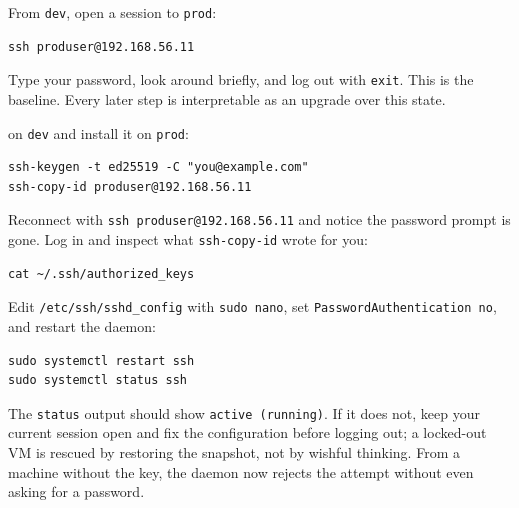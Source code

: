 From \texttt{dev}, open a session to \texttt{prod}:

\begin{verbatim}
ssh produser@192.168.56.11
\end{verbatim}

Type your password, look around briefly, and log out with \texttt{exit}. This is the baseline. Every later step is interpretable as an upgrade over this state.

 on \texttt{dev} and install it on \texttt{prod}:

\begin{verbatim}
ssh-keygen -t ed25519 -C "you@example.com"
ssh-copy-id produser@192.168.56.11
\end{verbatim}

Reconnect with \texttt{ssh produser@192.168.56.11} and notice the password prompt is gone. Log in and inspect what \texttt{ssh-copy-id} wrote for you:

\begin{verbatim}
cat ~/.ssh/authorized_keys
\end{verbatim}




Edit \texttt{/etc/ssh/sshd\_config} with \texttt{sudo nano}, set \texttt{PasswordAuthentication no}, and restart the daemon:

\begin{verbatim}
sudo systemctl restart ssh
sudo systemctl status ssh
\end{verbatim}

The \texttt{status} output should show \texttt{active (running)}. If it does not, keep your current session open and fix the configuration before logging out; a locked-out VM is rescued by restoring the snapshot, not by wishful thinking. From a machine without the key, the daemon now rejects the attempt without even asking for a password.

